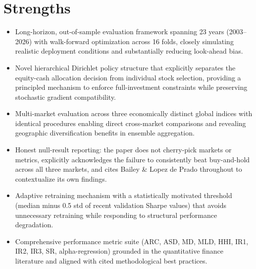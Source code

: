 \documentclass[11pt]{article}
\begin{document}
\section*{Strengths}
\begin{itemize}[leftmargin=*]
  \item Long-horizon, out-of-sample evaluation framework spanning 23 years (2003–2026) with walk-forward optimization across 16 folds, closely simulating realistic deployment conditions and substantially reducing look-ahead bias.
  \item Novel hierarchical Dirichlet policy structure that explicitly separates the equity-cash allocation decision from individual stock selection, providing a principled mechanism to enforce full-investment constraints while preserving stochastic gradient compatibility.
  \item Multi-market evaluation across three economically distinct global indices with identical procedures enabling direct cross-market comparisons and revealing geographic diversification benefits in ensemble aggregation.
  \item Honest null-result reporting: the paper does not cherry-pick markets or metrics, explicitly acknowledges the failure to consistently beat buy-and-hold across all three markets, and cites Bailey \& Lopez de Prado throughout to contextualize its own findings.
  \item Adaptive retraining mechanism with a statistically motivated threshold (median minus 0.5 std of recent validation Sharpe values) that avoids unnecessary retraining while responding to structural performance degradation.
  \item Comprehensive performance metric suite (ARC, ASD, MD, MLD, HHI, IR1, IR2, IR3, SR, alpha-regression) grounded in the quantitative finance literature and aligned with cited methodological best practices.
\end{itemize}
\end{document}
